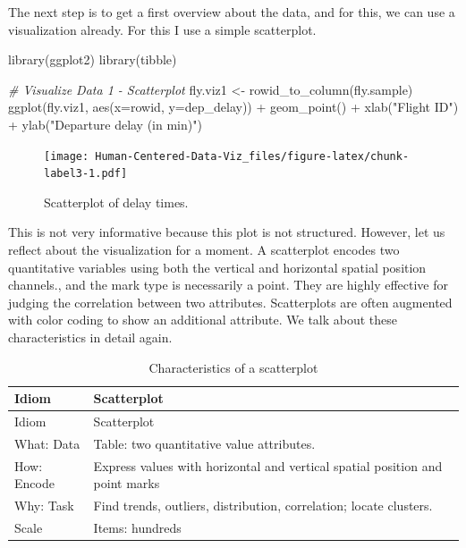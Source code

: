 \documentclass[
]{book}
\newenvironment{Shaded}{\begin{snugshade}}{\end{snugshade}}
\newcommand{\AttributeTok}[1]{\textcolor[rgb]{0.77,0.63,0.00}{#1}}
\newcommand{\CommentTok}[1]{\textcolor[rgb]{0.56,0.35,0.01}{\textit{#1}}}
\newcommand{\FunctionTok}[1]{\textcolor[rgb]{0.00,0.00,0.00}{#1}}
\newcommand{\NormalTok}[1]{#1}
\newcommand{\OtherTok}[1]{\textcolor[rgb]{0.56,0.35,0.01}{#1}}
\newcommand{\SpecialCharTok}[1]{\textcolor[rgb]{0.00,0.00,0.00}{#1}}
\newcommand{\StringTok}[1]{\textcolor[rgb]{0.31,0.60,0.02}{#1}}
\begin{document}
The next step is to get a first overview about the data, and for this, we can use a visualization already. For this I use a simple scatterplot.

\begin{Shaded}
\begin{Highlighting}[]
\FunctionTok{library}\NormalTok{(ggplot2)}
\FunctionTok{library}\NormalTok{(tibble)}

\CommentTok{\# Visualize Data 1 {-} Scatterplot}
\NormalTok{fly.viz1 }\OtherTok{\textless{}{-}} \FunctionTok{rowid\_to\_column}\NormalTok{(fly.sample)}
\FunctionTok{ggplot}\NormalTok{(fly.viz1, }\FunctionTok{aes}\NormalTok{(}\AttributeTok{x=}\NormalTok{rowid, }\AttributeTok{y=}\NormalTok{dep\_delay)) }\SpecialCharTok{+} \FunctionTok{geom\_point}\NormalTok{() }\SpecialCharTok{+} 
  \FunctionTok{xlab}\NormalTok{(}\StringTok{"Flight ID"}\NormalTok{) }\SpecialCharTok{+} \FunctionTok{ylab}\NormalTok{(}\StringTok{"Departure delay (in min)"}\NormalTok{) }
\end{Highlighting}
\end{Shaded}

\begin{figure}
\centering
\texttt{[image: Human-Centered-Data-Viz\_files/figure-latex/chunk-label3-1.pdf]}
\caption{\label{fig:chunk-label3}Scatterplot of delay times.}
\end{figure}

This is not very informative because this plot is not structured. However, let us reflect about the visualization for a moment. A scatterplot encodes two quantitative variables using both the vertical and horizontal spatial position channels., and the mark type is necessarily a point. They are highly effective for judging the correlation between two attributes. Scatterplots are often augmented with color coding to show an additional attribute. We talk about these characteristics in detail again.

\begin{longtable}[]{@{}
  >{\raggedright\arraybackslash}p{}
  >{\raggedright\arraybackslash}p{}@{}}
\caption{Characteristics of a scatterplot \citep{munzner2014visualization}}\tabularnewline
\toprule
Idiom & Scatterplot \\
\midrule
\endfirsthead
\toprule
Idiom & Scatterplot \\
\midrule
\endhead
What: Data & Table: two quantitative value attributes. \\
How: Encode & Express values with horizontal and vertical spatial position and point marks \\
Why: Task & Find trends, outliers, distribution, correlation; locate clusters. \\
Scale & Items: hundreds \\
\bottomrule
\end{longtable}
\end{document}
